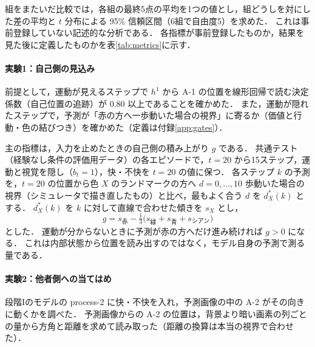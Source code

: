 組をまたいだ比較では，各組の最終5点の平均を1つの値とし，組どうしを対にした差の平均と $t$ 分布による 95\% 信頼区間（6組で自由度5）を求めた．
これは事前登録していない記述的な分析である．
各指標が事前登録したものか，結果を見た後に定義したものかを表\ref{tab:metrics}に示す．

\begin{table}[t]
  \centering
  \caption{指標の定義と事前登録の区別}
  \label{tab:metrics}
  
\end{table}

\paragraph{実験1：自己側の見込み}
前提として，運動が見えるステップで $h^1$ から A-1 の位置を線形回帰で読む決定係数（自己位置の追跡）が 0.80 以上であることを確かめた．
また，運動が隠れたステップで，予測が「赤の方へ一歩動いた場合の視界」に寄るか（価値と行動・色の結びつき）を確かめた（定義は付録\ref{app:gates}）．

主の指標は，入力を止めたときの自己側の積み上がり $g$ である．
共通テスト（経験なし条件の評価用データ）の各エピソードで，$t=20$ から15ステップ，運動と視覚を隠し（$b_t=1$），快・不快を $t=20$ の値に保つ．
各ステップ $k$ の予測を，$t=20$ の位置から色 $X$ のランドマークの方へ $d=0,\dots,10$ 歩動いた場合の視界（シミュレータで描き直したもの）と比べ，最もよく合う $d$ を $d^{*}_{X}(k)$ とする．
$d^{*}_{X}(k)$ を $k$ に対して直線で合わせた傾きを $s_X$ とし，
\begin{equation}
  g = s_{\text{赤}} - \tfrac{1}{3}\bigl(s_{\text{緑}} + s_{\text{青}} + s_{\text{シアン}}\bigr)
\end{equation}
とした．
運動が分からないときに予測が赤の方へだけ進み続ければ $g>0$ になる．
これは内部状態から位置を読み出すのではなく，モデル自身の予測で測る量である．

\paragraph{実験2：他者側への当てはめ}
段階Iのモデルの process-2 に快・不快を入れ，予測画像の中の A-2 がその向きに動くかを調べた．
予測画像からの A-2 の位置は，背景より暗い画素の列ごとの量から方角と距離を求めて読み取った（距離の換算は本当の視界で合わせた）．

